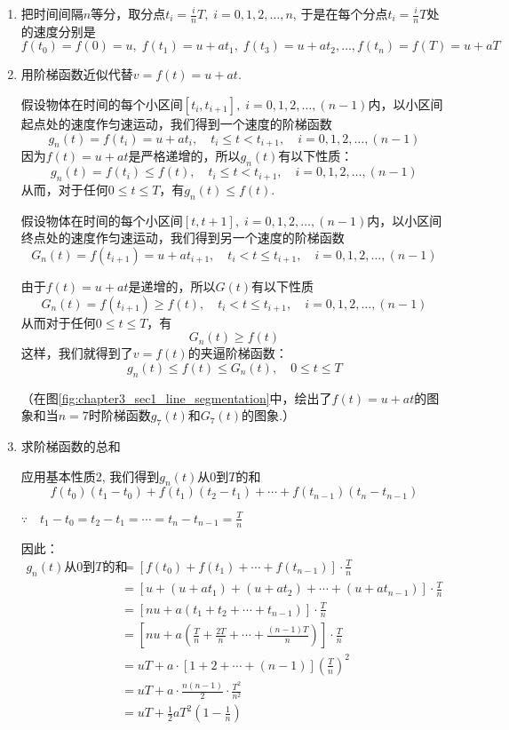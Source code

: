 \begin{solution}
\begin{enumerate}
    \item 把时间间隔$n$等分，取分点$t_i=\frac{i}{n}T,\; i=0,1, 2,\ldots,n$, 于是在每个分点$t_i=\frac{i}{n}T$处的速度分别是
\[f (t_0) =f (0) =u,\;  f(t_1) =u+at_1,\; f (t_3) =u+at_2,\ldots,f (t_n) =f (T) =u+aT\]
\item 用阶梯函数近似代替$v=f(t)=u+at$. 

假设物体在时间的每个小区间$[t_i,t_{i+1}],\; i=0,1, 2,\ldots,(n-1)$内，以小区间起点处的速度作匀速运动，我们得到一个速度的阶梯函数
\[g_n (t)=f(t_i)=u+at_i,\quad t_i\le t<t_{i+1},\quad i=0,1,2,\ldots,(n-1)\]
因为$f(t)=u+at$是严格递增的，所以$g_n(t)$有以下性质：
\[g_n (t)=f(t_i)\le f(t),\quad t_i\le t<t_{i+1},\quad i=0,1,2,\ldots,(n-1)\]
从而，对于任何$0\le t\le T$，有$g_n(t)\le f(t)$.

假设物体在时间的每个小区间$[t,t+1],\; i=0,1, 2,\ldots,(n-1)$内，以小区间终点处的速度作匀速运动，我们得到另一个速度的阶梯函数
\[G_n(t)=f(t_{i+1})=u+at_{i+1},\quad t_i< t\le t_{i+1},\quad i=0,1,2,\ldots,(n-1)\]

由于$f(t)=u+at$是递增的，所以$G(t)$有以下性质
\[G_n (t)=f(t_{i+1})\ge f(t),\quad t_i< t\le t_{i+1},\quad i=0,1,2,\ldots,(n-1)\]
从而对于任何$0\le t\le T$，有
\[G_n(t)\ge f(t)\]
这样，我们就得到了$v=f(t)$的夹逼阶梯函数：
\[ g_n(t) \le f (t) \le G_n (t),\quad 0\le t\le T\]

（在图\ref{fig:chapter3_sec1_line_segmentation}中，绘出了$f(t)=u+at$的图象和当$n=7$时阶梯函数$g_7(t)$和$G_7(t)$的图象.）

\item 求阶梯函数的总和

应用基本性质2, 我们得到$g_n(t)$从0到$T$的和
\[f(t_0)(t_1-t_0)+f(t_1)(t_2-t_1)+\cdots+f (t_{n-1}) (t_n-t_{n-1})\]

$\because\quad t_1-t_0=t_2-t_1=\cdots=t_n-t_{n-1}=\frac{T}{n}$

因此：
\begin{align*}
\text{$g_n(t)$从0到$T$的和}&=\left[f(t_0)+f(t_1)+\cdots+f(t_{n-1})\right]\cdot \frac{T}{n}\\
&=\left[u+(u+at_1)+(u+at_2)+\cdots +(u+at_{n-1})\right]\cdot \frac{T}{n}\\
&=\left[nu+a(t_1+t_2+\cdots+t_{n-1})\right]\cdot \frac{T}{n}\\
&=\left[nu+a\left(\frac{T}{n}+\frac{2T}{n}+\cdots+\frac{(n-1)T}{n}\right)\right]\cdot \frac{T}{n}\\
&=uT+a\cdot [1+2+\cdots+(n-1)]\left(\frac{T}{n}\right)^2\\
&=uT+a\cdot \frac{n(n-1)}{2}\cdot \frac{T^2}{n^2}\\
&=uT+\frac{1}{2}aT^2\left(1-\frac{1}{n}\right)
\end{align*}


\end{enumerate}
\end{solution}
